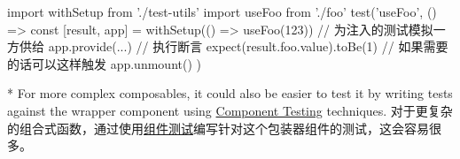 \begin{paracol}{2}
\begin{codeJs}
import { withSetup } from './test-utils'
import { useFoo } from './foo'
test('useFoo', () => {
  const [result, app] = withSetup(() => useFoo(123))
  // 为注入的测试模拟一方供给
  app.provide(...)
  // 执行断言
  expect(result.foo.value).toBe(1)
  // 如果需要的话可以这样触发
  app.unmount()
})
\end{codeJs}
\switchcolumn[0]*%
For more complex composables, it could also be easier to test it by
writing tests against the wrapper component using
\href{https://vuejs.org/guide/scaling-up/testing.html\#component-testing}{Component
Testing} techniques.
\switchcolumn
对于更复杂的组合式函数，通过使用\href{https://cn.vuejs.org/guide/scaling-up/testing.html\#component-testing}{组件测试}编写针对这个包装器组件的测试，这会容易很多。
\end{paracol}

